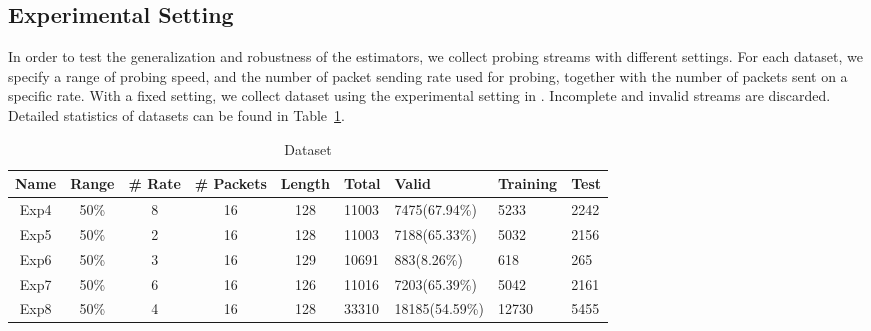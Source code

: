 \subsection{Experimental Setting}
\label{sub:parameter_setting}
In order to test the generalization and robustness of the estimators, we
collect probing streams with different settings.
For each dataset, we specify a range of probing speed, and the number of packet
sending rate used for probing, together with the number of packets sent on a
specific rate. With a fixed setting, we collect dataset using the experimental
setting in \cite{Yin2014}. Incomplete and invalid streams are discarded.
Detailed statistics of datasets can be found in Table~\ref{tab:dataset}.

\begin{table}[htpb]
   \centering
   \caption{Dataset}
   \label{tab:dataset}
   \begin{tabular}{|c|c|c|c|c|l|l|l|l|}
      \hline
      Name & Range & \# Rate & \# Packets & Length & Total & Valid          & Training & Test\\ \hline
      Exp4 & 50\%  & 8       & 16         & 128    & 11003 & 7475(67.94\%)  & 5233     & 2242 \\
      Exp5 & 50\%  & 2       & 16         & 128    & 11003 & 7188(65.33\%)  & 5032     & 2156 \\
      Exp6 & 50\%  & 3       & 16         & 129    & 10691 & 883(8.26\%)    & 618      & 265 \\
      Exp7 & 50\%  & 6       & 16         & 126    & 11016 & 7203(65.39\%)  & 5042     & 2161 \\
      Exp8 & 50\%  & 4       & 16         & 128    & 33310 & 18185(54.59\%) & 12730    & 5455  \\ \hline
   \end{tabular}
\end{table}

